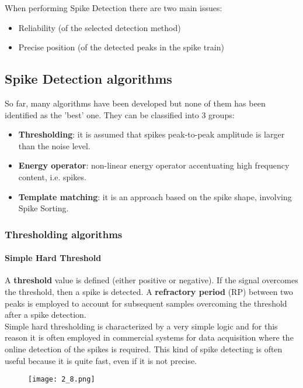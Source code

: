 When performing Spike Detection there are two main issues:
\begin{itemize}
    \item Reliability (of the selected detection method)
    \item Precise position (of the detected peaks in the spike train)
\end{itemize}

\subsection{Spike Detection algorithms}
So far, many algorithms have been developed but none of them has been identified as the 'best' one. They can be classified into 3 groups:
\begin{itemize}
    \item \textbf{Thresholding}: it is assumed that spikes peak-to-peak amplitude is larger than the noise level.
    \item \textbf{Energy operator}: non-linear energy operator accentuating high frequency content, i.e. spikes.
    \item \textbf{Template matching}: it is an approach based on the spike shape, involving Spike Sorting.
\end{itemize}

\subsubsection{Thresholding algorithms}
\paragraph{Simple Hard Threshold}
A \textbf{threshold} value is defined (either positive or negative). If the signal overcomes the threshold, then a spike is detected. A \textbf{refractory period} (RP) between two peaks is employed to account for subsequent samples overcoming the threshold after a spike detection.\\
Simple hard thresholding is characterized by a very simple logic and for this reason it is often employed in commercial systems for data acquisition where the online detection of the spikes is required. This kind of spike detecting is often useful because it is quite fast, even if it is not precise.
\begin{figure}[H]
    \centering
    \texttt{[image: 2\_8.png]}
\end{figure}
